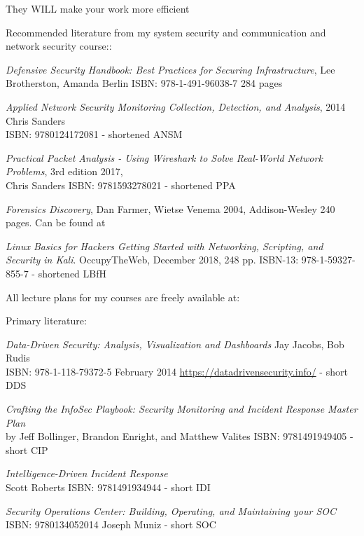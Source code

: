 \documentclass[Screen16to9,17pt]{foils}
\begin{document}
They WILL make your work more efficient


Recommended literature from my system security and communication and network security course::
\begin{list2}
\item \emph{Defensive Security Handbook: Best Practices for Securing Infrastructure}, Lee Brotherston, Amanda Berlin ISBN: 978-1-491-96038-7 284 pages
\item \emph{Applied Network Security Monitoring Collection, Detection, and Analysis}, 2014 Chris Sanders \\
ISBN: 9780124172081 - shortened ANSM
\item \emph{Practical Packet Analysis - Using Wireshark to Solve Real-World Network Problems}, 3rd edition 2017, \\
Chris Sanders ISBN: 9781593278021 - shortened PPA
\item \emph{Forensics Discovery}, Dan Farmer, Wietse Venema 2004, Addison-Wesley 240 pages. Can be found at 
\item \emph{Linux Basics for Hackers Getting Started with Networking, Scripting, and Security in Kali}. OccupyTheWeb, December 2018, 248 pp. ISBN-13: 978-1-59327-855-7 - shortened LBfH
\end{list2}

All lecture plans for my courses are freely available at:


Primary literature:
\begin{list2}
\item \emph{Data-Driven Security: Analysis, Visualization and Dashboards} Jay Jacobs, Bob Rudis\\
ISBN: 978-1-118-79372-5 February 2014 \url{https://datadrivensecurity.info/} - short DDS
\item \emph{Crafting the InfoSec Playbook: Security Monitoring and Incident Response Master Plan}\\
 by Jeff Bollinger, Brandon Enright, and Matthew Valites ISBN: 9781491949405 - short CIP
\item \emph{Intelligence-Driven Incident Response} \\
 Scott Roberts ISBN: 9781491934944 - short IDI
\item \emph{Security Operations Center: Building, Operating, and Maintaining your SOC}\\
ISBN: 9780134052014 Joseph Muniz - short SOC
\end{list2}
\end{document}
